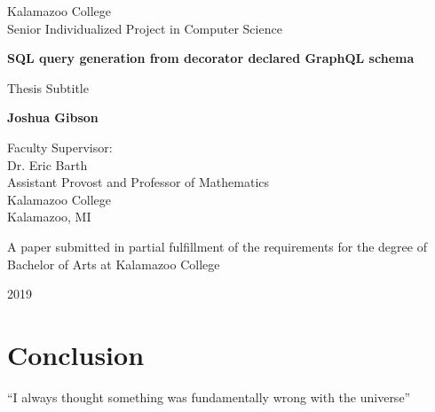 \documentclass[12pt]{article}
\begin{document}
\begin{titlepage}
   \begin{center}
        Kalamazoo College\\
        Senior Individualized Project in Computer Science
       \vspace*{3cm}
 
       \textbf{SQL query generation from decorator declared GraphQL schema}
 
       \vspace{0.5cm}
        Thesis Subtitle
 
       \vspace{1.5cm}
 
       \textbf{Joshua Gibson}
 
       \vspace{4cm}
 
       Faculty Supervisor:\\
       Dr. Eric Barth\\
       Assistant Provost and Professor of Mathematics\\
       Kalamazoo College\\
       Kalamazoo, MI
       
       \vspace{3cm}
       
       A paper submitted in partial fulfillment of the requirements for the degree of Bachelor of Arts at Kalamazoo College
       
       \vspace{2cm}
       2019
 
   \end{center}
\end{titlepage}


\null \newpage

\setcounter{page}{2}

\tableofcontents
\newpage

\doublespacing





\section{Conclusion}
``I always thought something was fundamentally wrong with the universe'' \citep{adams1995hitchhiker}

\newpage
\setcounter{page}{1}


\end{document}
